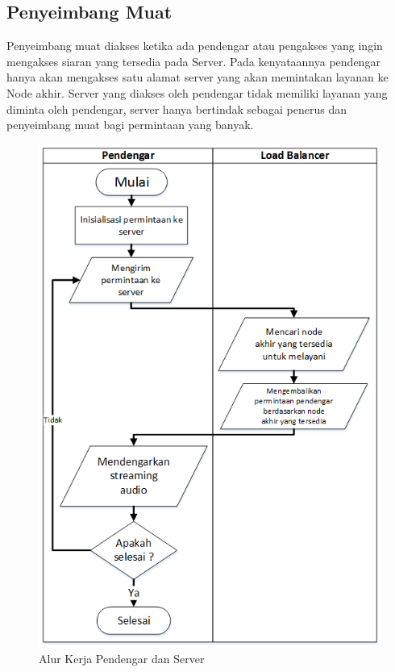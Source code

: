 \subsection{Penyeimbang Muat}
Penyeimbang muat diakses ketika ada pendengar atau pengakses yang ingin mengakses siaran yang tersedia pada Server. Pada kenyataannya pendengar hanya akan mengakses satu alamat server yang akan memintakan layanan ke Node akhir. Server yang diakses oleh pendengar tidak memiliki layanan yang diminta oleh pendengar, server hanya bertindak sebagai penerus dan penyeimbang muat bagi permintaan yang banyak.

\begin{figure}[h]
    \centering
    \includegraphics[width=1\linewidth]{dengar-server}
    \caption{Alur Kerja Pendengar dan Server}
    \label{fig:dengar-server}
\end{figure}

